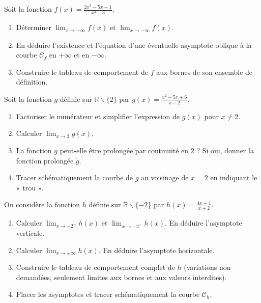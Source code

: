 \documentclass[11pt]{article}
\newcounter{popsec}
\newcounter{popsub}
\newcommand{\courssub}[1]{%
  \stepcounter{popsub}%
  \par\vspace{9pt}\noindent{\popxbold\fontsize{11.5}{13}\selectfont\color{popink}{\color{poporange}\thepopsec.\thepopsub}\hspace{6pt}#1}\par\nopagebreak\vspace{4pt}
}
\def\setminus{\mathbin{\backslash}}\let\smallsetminus\setminus
\begin{document}
\courssub{Je m'entraîne}

\begin{exercice}
Soit la fonction $f(x) = \frac{2x^3 - 5x + 1}{x^2 + 3}$.
\begin{enumerate}
\item Déterminer $\lim_{x\to +\infty} f(x)$ et $\lim_{x\to -\infty} f(x)$.
\item En déduire l'existence et l'équation d'une éventuelle asymptote oblique à la courbe $\mathcal{C}_f$ en $+\infty$ et en $-\infty$.
\item Construire le tableau de comportement de $f$ aux bornes de son ensemble de définition.
\end{enumerate}
\end{exercice}

\begin{exercice}
Soit la fonction $g$ définie sur $\mathbb{R} \setminus \{2\}$ par $g(x) = \frac{x^2 - 5x + 6}{x - 2}$.
\begin{enumerate}
\item Factoriser le numérateur et simplifier l'expression de $g(x)$ pour $x \neq 2$.
\item Calculer $\lim_{x\to 2} g(x)$.
\item La fonction $g$ peut-elle être prolongée par continuité en $2$ ? Si oui, donner la fonction prolongée $\tilde{g}$.
\item Tracer schématiquement la courbe de $g$ au voisinage de $x=2$ en indiquant le « trou ».
\end{enumerate}
\end{exercice}

\begin{exercice}
On considère la fonction $h$ définie sur $\mathbb{R} \setminus \{-2\}$ par $h(x) = \frac{4x - 1}{x + 2}$.
\begin{enumerate}
\item Calculer $\lim_{x\to -2^-} h(x)$ et $\lim_{x\to -2^+} h(x)$. En déduire l'asymptote verticale.
\item Calculer $\lim_{x\to \pm\infty} h(x)$. En déduire l'asymptote horizontale.
\item Construire le tableau de comportement complet de $h$ (variations non demandées, seulement limites aux bornes et aux valeurs interdites).
\item Placer les asymptotes et tracer schématiquement la courbe $\mathcal{C}_h$.
\end{enumerate}
\end{exercice}
\end{document}
